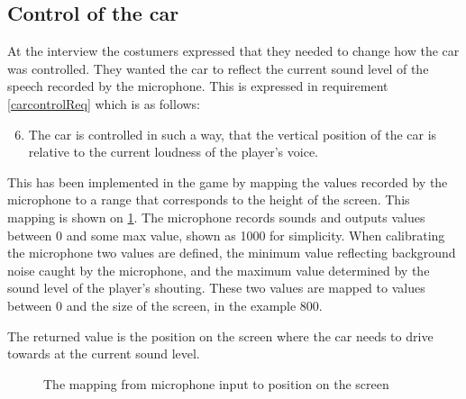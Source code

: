 \subsection{Control of the car}
At the interview the costumers expressed that they needed to change how the car was controlled.
They wanted the car to reflect the current sound level of the speech recorded by the microphone.
This is expressed in requirement \ref{carcontrolReq} which is as follows:
\begin{enumerate}
\setcounter{enumi}{5}
\item The car is controlled in such a way, that the vertical position of the car is relative to the current loudness of the player's voice.
\end{enumerate}

This has been implemented in the game by mapping the values recorded by the microphone to a range that corresponds to the height of the screen.
This mapping is shown on \cref{mapping}.
The microphone records sounds and outputs values between 0 and some max value, shown as 1000 for simplicity.
When calibrating the microphone two values are defined, the minimum value reflecting background noise caught by the microphone, and the maximum value determined by the sound level of the player's shouting.
These two values are mapped to values between 0 and the size of the screen, in the example 800.

The returned value is the position on the screen where the car needs to drive towards at the current sound level.

\begin{figure}
\centering

\caption{The mapping from microphone input to position on the screen}
\label{mapping}
\end{figure}


